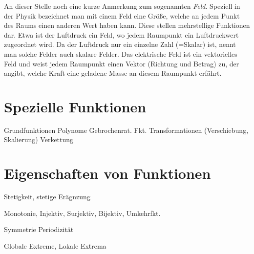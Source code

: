 An dieser Stelle noch eine kurze Anmerkung zum sogenannten \emph{Feld}. Speziell in der Physik bezeichnet man mit einem Feld eine Größe, welche an jedem Punkt des Raums einen anderen Wert haben kann. Diese stellen mehrstellige Funktionen dar. Etwa ist der Luftdruck ein Feld, wo jedem Raumpunkt ein Luftdruckwert zugeordnet wird. Da der Luftdruck nur ein einzelne Zahl (=Skalar) ist, nennt man solche Felder auch skalare Felder. Das elektrische Feld ist ein vektorielles Feld und weist jedem Raumpunkt einen Vektor (Richtung und Betrag) zu, der angibt, welche Kraft eine geladene Masse an diesem Raumpunkt erfährt.

\section{Spezielle Funktionen}

Grundfunktionen
Polynome
Gebrochenrat. Fkt.
Transformationen (Verschiebung, Skalierung)
Verkettung

\section{Eigenschaften von Funktionen}
Stetigkeit, stetige Erägnzung

Monotonie, Injektiv, Surjektiv, Bijektiv, Umkehrfkt.

Symmetrie Periodizität

Globale Extreme, Lokale Extrema
